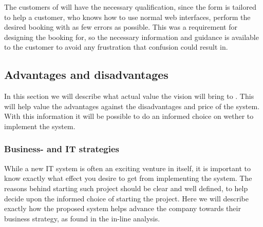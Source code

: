 The customers of \gomonkey{} will have the necessary qualification, since the
form is tailored to help a customer, who knows how to use normal web interfaces,
perform the desired booking with as few errors as possible. This was a 
requirement for designing the booking for, so the necessary information and
guidance is available to the customer to avoid any frustration that confusion
could result in.

\subsection{Advantages and disadvantages}
In this section we will describe what actual value the vision will bring to 
\gomonkey. This will help value the advantages against the disadvantages and
price of the system. With this information it will be possible to do an informed
choice on wether to implement the system.

\subsubsection{Business- and IT strategies}
While a new IT system is often an exciting venture in itself, it is important to
know exactly what effect you desire to get from implementing the system. The 
reasons behind starting such project should be clear and well defined, to help
decide upon the informed choice of starting the project. Here we will describe 
exactly how the proposed system helps advance the company towards their 
business strategy, as found in the in-line analysis. 

